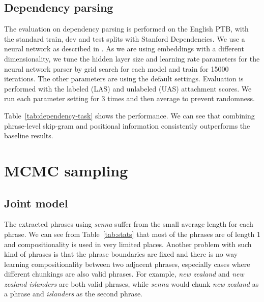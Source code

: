 \subsection{Dependency parsing}
\begin{table}
\centering
\begin{center}
\caption{\small{dependency parsing results on PTB using different embeddings}}
\label{tab:dependency-task}
\end{center}
\end{table}
The evaluation on dependency parsing is performed on the English PTB, with the standard train, dev and
test splits with Stanford Dependencies. We use a neural network as described in . 
As we are using embeddings with a different dimensionality, we tune the hidden layer size and 
learning rate parameters for the neural network parser by grid search for each model and train for 15000 iterations. 
The other parameters are 
using the default settings. Evaluation is performed with the labeled (LAS) and unlabeled
(UAS) attachment scores. We run each parameter setting for 3 times and then average to prevent randomness.


Table~\ref{tab:dependency-task} shows the performance. 
We can see that combining phrase-level skip-gram and 
positional information consistently outperforms the baseline results.
\section{MCMC sampling}
\subsection{Joint model}
The extracted phrases using \textit{senna} suffer from the small average length for each phrase. We can see from 
Table~\ref{tab:stats} that most of the phrases are of length 1 and compositionality is used in very limited places.
Another problem with such kind of phrases is that the phrase boundaries are fixed and there is no way learning compositionality
between two adjacent phrases, especially cases where different chunkings are also valid phrases. For example,
\textit{new zealand} and \textit{new zealand islanders} are both valid phrases, while \textit{senna} would chunk \textit{new zealand}
as a phrase and \textit{islanders} as the second phrase. 


